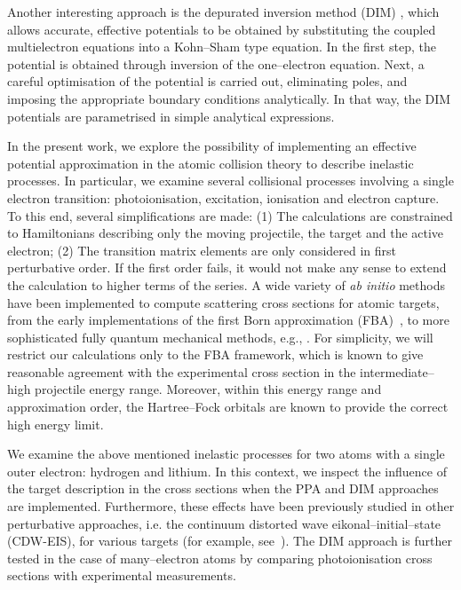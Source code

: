 \documentclass[10pt]{article}
\begin{document}
Another interesting approach is the depurated inversion method 
(DIM) \cite{Mendez2015,Mendez2016,Mendez2018}, which allows accurate, 
effective potentials to be obtained by substituting the coupled 
multielectron equations into a Kohn--Sham type equation. In the first 
step, the potential is obtained through inversion of the 
one--electron equation. Next, a careful optimisation of the potential 
is carried out, eliminating poles, and imposing the appropriate 
boundary conditions analytically. In that way, the DIM potentials are 
parametrised in simple analytical expressions.

In the present work, we explore the possibility of implementing an 
effective potential approximation in the atomic collision theory to 
describe inelastic processes. In particular, we examine several 
collisional processes involving a single electron transition: 
photoionisation, excitation, ionisation and electron capture. To this 
end, several simplifications are made: (1) The calculations are 
constrained to Hamiltonians describing only the moving projectile, 
the target and the active electron; (2) The transition matrix 
elements are only considered in first perturbative order. If the 
first order fails, it would not make any sense to extend the 
calculation to higher terms of the series. A wide variety of {\it ab 
initio} methods have been implemented to compute scattering cross 
sections for atomic targets, from the early implementations of the 
first Born approximation (FBA)~\cite{Bates1962,McDowell1961}, to more 
sophisticated fully quantum mechanical methods, e.g., 
\cite{Pindzola2007,Burke2011,Bray2017,Pindzola2016}. For simplicity, 
we will restrict our calculations only to the FBA framework, which is 
known to give reasonable agreement with the experimental cross 
section in the intermediate--high projectile energy range. Moreover, 
within this energy range and approximation order, the Hartree--Fock 
orbitals are known to provide the correct high energy limit.

We examine the above mentioned inelastic processes for two atoms with 
a single outer electron: hydrogen and lithium. In this context, we 
inspect the influence of the target description in the cross sections 
when the PPA and DIM approaches are implemented. Furthermore, these 
effects have been previously studied in other perturbative approaches,
i.e. the continuum distorted wave eikonal--initial--state (CDW-EIS), 
for various targets (for example, see~\cite{Kirchner1998,Fiori2001}).
The DIM approach is further tested in the case of many--electron 
atoms by comparing photoionisation cross sections with experimental 
measurements. 
\end{document}
